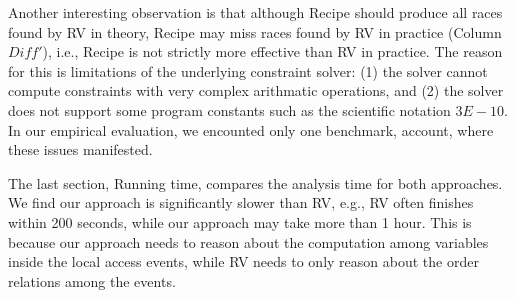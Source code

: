  

Another interesting observation is that although {\sf Recipe} should produce all races found by {\sf RV} in theory, {\sf Recipe} may miss races found by {\sf RV} in practice (Column $Diff'$), i.e., {\sf Recipe} is not strictly more effective than {\sf RV} in practice. The reason for this is limitations of the underlying constraint solver: (1) the solver cannot compute constraints with very complex arithmatic operations, and (2) the solver does not support some program constants such as the scientific notation $3E-10$. In our empirical evaluation, we encounted only one benchmark, account, where these issues manifested.

The last section, Running time, compares the analysis time for both approaches. We find our approach is significantly slower than {\sf RV}, e.g., {\sf RV} often finishes within 200 seconds, while our approach may take more than 1 hour. This is because our approach needs to reason about the computation among variables inside the local access events, while {\sf RV} needs to only reason about the order relations among the events.


 













